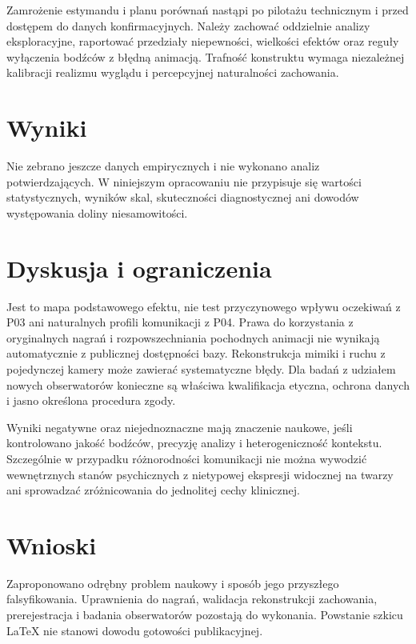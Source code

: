 \documentclass[11pt,a4paper]{article}
\begin{document}
Zamrożenie estymandu i planu porównań nastąpi po pilotażu technicznym i przed dostępem do danych konfirmacyjnych. Należy zachować oddzielnie analizy eksploracyjne, raportować przedziały niepewności, wielkości efektów oraz reguły wyłączenia bodźców z błędną animacją. Trafność konstruktu wymaga niezależnej kalibracji realizmu wyglądu i percepcyjnej naturalności zachowania.

\section{Wyniki}
Nie zebrano jeszcze danych empirycznych i nie wykonano analiz potwierdzających. W niniejszym opracowaniu nie przypisuje się wartości statystycznych, wyników skal, skuteczności diagnostycznej ani dowodów występowania doliny niesamowitości.
\section{Dyskusja i ograniczenia}
Jest to mapa podstawowego efektu, nie test przyczynowego wpływu oczekiwań z P03 ani naturalnych profili komunikacji z P04. Prawa do korzystania z oryginalnych nagrań i rozpowszechniania pochodnych animacji nie wynikają automatycznie z publicznej dostępności bazy. Rekonstrukcja mimiki i ruchu z pojedynczej kamery może zawierać systematyczne błędy. Dla badań z udziałem nowych obserwatorów konieczne są właściwa kwalifikacja etyczna, ochrona danych i jasno określona procedura zgody.

Wyniki negatywne oraz niejednoznaczne mają znaczenie naukowe, jeśli kontrolowano jakość bodźców, precyzję analizy i heterogeniczność kontekstu. Szczególnie w przypadku różnorodności komunikacji nie można wywodzić wewnętrznych stanów psychicznych z nietypowej ekspresji widocznej na twarzy ani sprowadzać zróżnicowania do jednolitej cechy klinicznej.
\section{Wnioski}
Zaproponowano odrębny problem naukowy i sposób jego przyszłego falsyfikowania. Uprawnienia do nagrań, walidacja rekonstrukcji zachowania, prerejestracja i badania obserwatorów pozostają do wykonania. Powstanie szkicu LaTeX nie stanowi dowodu gotowości publikacyjnej.
\end{document}
